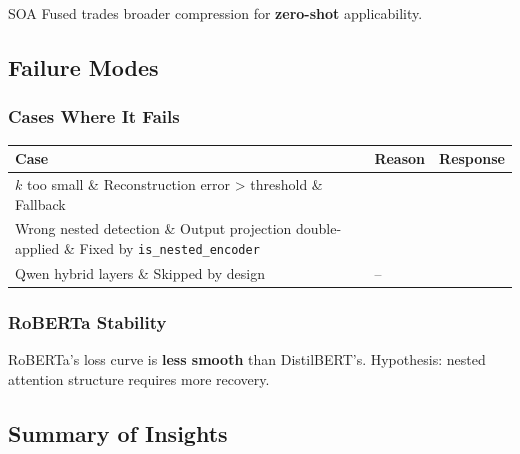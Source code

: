 SOA Fused trades broader compression for \textbf{zero-shot} applicability.

\subsection{Failure Modes}

\subsubsection{Cases Where It Fails}

\begin{table}[H]
\centering
\small
\begin{tabular}{lll}
\toprule
\textbf{Case} & \textbf{Reason} & \textbf{Response} \\
\midrule
$k$ too small \& Reconstruction error > threshold \& Fallback \\
Wrong nested detection \& Output projection double-applied \& Fixed by \texttt{is\_nested\_encoder} \\
Qwen hybrid layers \& Skipped by design & -- \\
\bottomrule
\end{tabular}
\end{table}

\subsubsection{RoBERTa Stability}

RoBERTa's loss curve is \textbf{less smooth} than DistilBERT's. Hypothesis: 
nested attention structure requires more recovery.

\subsection{Summary of Insights}

